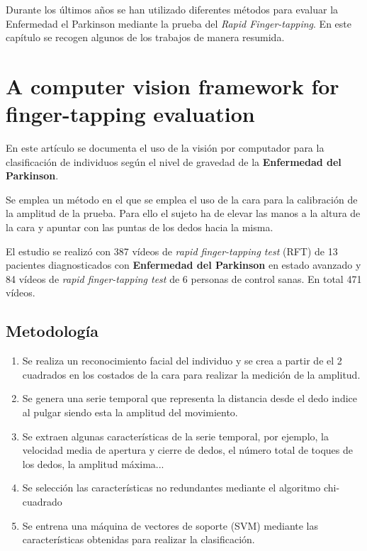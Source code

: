 
Durante los últimos años se han utilizado diferentes métodos para evaluar la Enfermedad el Parkinson mediante la prueba del \textit{Rapid Finger-tapping}. En este capítulo se recogen algunos de los trabajos de manera resumida.

\section{A computer vision framework for finger-tapping evaluation}

En este artículo se documenta el uso de la visión por computador para la clasificación de individuos según el nivel de gravedad de la \textbf{Enfermedad del Parkinson}.

Se emplea un método en el que se emplea el uso de la cara para la calibración de la amplitud de la prueba. Para ello el sujeto ha de elevar las manos a la altura de la cara y apuntar con las puntas de los dedos hacia la misma.

El estudio se realizó con 387 vídeos de \textit{rapid finger-tapping test} (RFT) de 13 pacientes diagnosticados con \textbf{Enfermedad del Parkinson} en estado avanzado y 84 vídeos de \textit{rapid finger-tapping test} de 6 personas de control sanas. En total 471 vídeos.

\subsection{Metodología}
\begin{enumerate}
	\item Se realiza un reconocimiento facial del individuo y se crea a partir de el 2 cuadrados en los costados de la cara para realizar la medición de la amplitud.
	\item Se genera una serie temporal que representa la distancia desde el dedo indice al pulgar siendo esta la amplitud del movimiento.
	\item Se extraen algunas características de la serie temporal, por ejemplo, la velocidad media de apertura y cierre de dedos, el número total de toques de los dedos, la amplitud máxima...
	\item Se selección las características no redundantes mediante el algoritmo chi-cuadrado
	\item Se entrena una máquina de vectores de soporte (SVM) mediante las características obtenidas para realizar la clasificación.

\end{enumerate}
